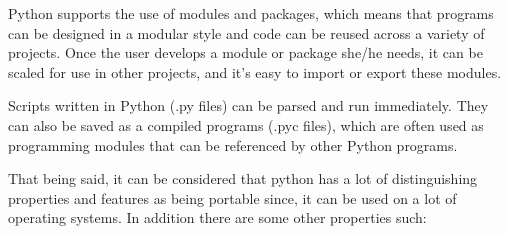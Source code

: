 Python supports the use of modules and packages, which
means that programs can be designed in a modular style and
code can be reused across a variety of projects. Once the
user develops a module or package she/he needs, it can be
scaled for use in other projects, and it's easy to import
or export these modules.\cite{amjad15}

Scripts written in Python (.py files) can be parsed and run
immediately. They can also be saved as a compiled programs
(.pyc files), which are often used as programming modules
that can be referenced by other Python programs.
\cite{amjad14}

That being said, it can be considered that python has a lot
of distinguishing properties and features as being portable
since, it can be used on a lot of operating systems. In
addition there are some other properties such:

